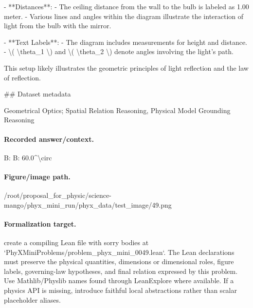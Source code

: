 - **Distances**:
  - The ceiling distance from the wall to the bulb is labeled as 1.00 meter.
  - Various lines and angles within the diagram illustrate the interaction of light from the bulb with the mirror.

- **Text Labels**:
  - The diagram includes measurements for height and distance.
  - \textbackslash{}( \textbackslash{}theta\_1 \textbackslash{}) and \textbackslash{}( \textbackslash{}theta\_2 \textbackslash{}) denote angles involving the light’s path.

This setup likely illustrates the geometric principles of light reflection and the law of reflection.

\#\# Dataset metadata

Geometrical Optics; Spatial Relation Reasoning, Physical Model Grounding Reasoning

\paragraph{Recorded answer/context.}
B: B: 60.0\textasciicircum{}\textbackslash{}circ

\paragraph{Figure/image path.}
/root/proposal\_for\_physic/science-mango/phyx\_mini\_run/phyx\_data/test\_image/49.png

\paragraph{Formalization target.}
create a compiling Lean file with sorry bodies at `PhyXMiniProblems/problem\_phyx\_mini\_0049.lean`. The Lean declarations must preserve the physical quantities, dimensions or dimensional roles, figure labels, governing-law hypotheses, and final relation expressed by this problem.
Use Mathlib/Physlib names found through LeanExplore where available. If a physics API is missing, introduce faithful local abstractions rather than scalar placeholder aliases.

